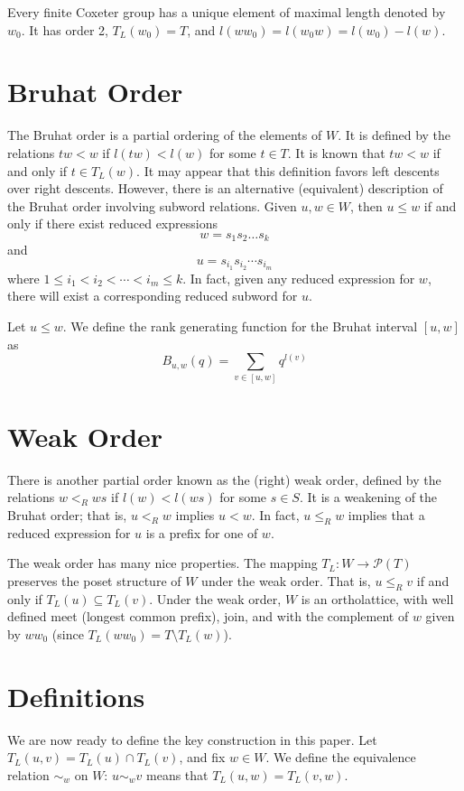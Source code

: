 \documentclass[11pt]{article}
\theoremstyle{definition}
\theoremstyle{definition}
\begin{document}
Every finite Coxeter group has a unique element of maximal length denoted by $w_0$. It has order 2, $T_L(w_0) = T$, and $l(ww_0) = l(w_0w) = l(w_0) - l(w)$.

\section{Bruhat Order}
The Bruhat order is a partial ordering of the elements of $W$. It is defined by the relations $tw < w$ if $l(tw) < l(w)$ for some $t \in T$. It is known that $tw < w$ if and only if $t \in T_L(w)$. It may appear that this definition favors left descents over right descents. However, there is an alternative (equivalent) description of the Bruhat order involving subword relations. Given $u, w \in W$, then $u\leq w$ if and only if there exist reduced expressions
\[
w = s_1s_2\ldots s_k
\]
and
\[
u = s_{i_1}s_{i_2}\cdots s_{i_m}
\]
where $1 \leq i_1 < i_2 < \cdots < i_m \leq k$. In fact, given any reduced expression for $w$, there will exist a corresponding reduced subword for $u$.

Let $u \leq w$. We define the rank generating function for the Bruhat interval $[u, w]$ as
\[
B_{u, w}(q) = \sum_{v \in [u, w]} q^{l(v)}
\]

\section{Weak Order}
There is another partial order known as the (right) weak order, defined by the relations $w <_R ws$ if $l(w) < l(ws)$ for some $s \in S$. It is a weakening of the Bruhat order; that is, $u <_R w$ implies $u < w$. In fact, $u \leq_R w$ implies that a reduced expression for $u$ is a prefix for one of $w$.

The weak order has many nice properties. The mapping $T_L : W \rightarrow \mathcal{P}(T)$ preserves the poset structure of $W$ under the weak order. That is, $u \leq_R v$ if and only if $T_L(u) \subseteq T_L(v)$. Under the weak order, $W$ is an ortholattice, with well defined meet (longest common prefix), join, and with the complement of $w$ given by $ww_0$ (since $T_L(ww_0) = T \setminus T_L(w)$). 

\section{Definitions}
We are now ready to define the key construction in this paper. Let $T_L(u, v) = T_L(u) \cap T_L(v)$, and fix $w \in W$. We define the equivalence relation $\sim_w$ on $W$: $u\sim_w v$ means that $T_L(u, w) = T_L(v, w)$.
\end{document}
